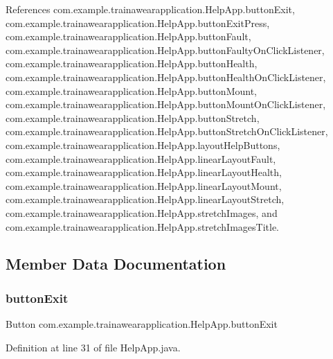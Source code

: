 References com.\+example.\+trainawearapplication.\+Help\+App.\+button\+Exit, com.\+example.\+trainawearapplication.\+Help\+App.\+button\+Exit\+Press, com.\+example.\+trainawearapplication.\+Help\+App.\+button\+Fault, com.\+example.\+trainawearapplication.\+Help\+App.\+button\+Faulty\+On\+Click\+Listener, com.\+example.\+trainawearapplication.\+Help\+App.\+button\+Health, com.\+example.\+trainawearapplication.\+Help\+App.\+button\+Health\+On\+Click\+Listener, com.\+example.\+trainawearapplication.\+Help\+App.\+button\+Mount, com.\+example.\+trainawearapplication.\+Help\+App.\+button\+Mount\+On\+Click\+Listener, com.\+example.\+trainawearapplication.\+Help\+App.\+button\+Stretch, com.\+example.\+trainawearapplication.\+Help\+App.\+button\+Stretch\+On\+Click\+Listener, com.\+example.\+trainawearapplication.\+Help\+App.\+layout\+Help\+Buttons, com.\+example.\+trainawearapplication.\+Help\+App.\+linear\+Layout\+Fault, com.\+example.\+trainawearapplication.\+Help\+App.\+linear\+Layout\+Health, com.\+example.\+trainawearapplication.\+Help\+App.\+linear\+Layout\+Mount, com.\+example.\+trainawearapplication.\+Help\+App.\+linear\+Layout\+Stretch, com.\+example.\+trainawearapplication.\+Help\+App.\+stretch\+Images, and com.\+example.\+trainawearapplication.\+Help\+App.\+stretch\+Images\+Title.



\subsection{Member Data Documentation}
\mbox{\label{classcom_1_1example_1_1trainawearapplication_1_1_help_app_a84fb9249fb28730b485a6bc71bc22867}} 
\subsubsection{\texorpdfstring{buttonExit}{buttonExit}}
{\footnotesize\ttfamily Button com.\+example.\+trainawearapplication.\+Help\+App.\+button\+Exit\hspace{0.3cm}{\ttfamily [package]}}



Definition at line 31 of file Help\+App.\+java.



